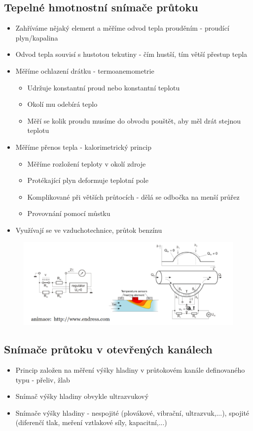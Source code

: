 \subsection*{Tepelné hmotnostní snímače průtoku}
\begin{itemize}
    \item Zahříváme nějaký element a měříme odvod tepla prouděním - proudící plyn/kapalina
    \item Odvod tepla souvisí s hustotou tekutiny - čím hustší, tím větší přestup tepla
    \item Měříme ochlazení drátku - termoanemometrie \begin{itemize}
        \item Udržuje konstantní proud nebo konstantní teplotu
        \item Okolí mu odebírá teplo
        \item Měří se kolik proudu musíme do obvodu pouštět, aby měl drát stejnou teplotu
    \end{itemize}
    \item Měříme přenos tepla - kalorimetrický princip \begin{itemize}
        \item Měříme rozložení teploty v okolí zdroje
        \item Protékající plyn deformuje teplotní pole
        \item Komplikované při větších průtocích - dělá se odbočka na menší průřez
        \item Provovnání pomocí můstku
    \end{itemize}
    \item Využívají se ve vzduchotechnice, průtok benzínu
\end{itemize}

\begin{figure}[h]
    \centering
    \includegraphics[scale = 1]{img/kalorime.png}
\end{figure}

\subsection*{Snímače průtoku v otevřených kanálech}
\begin{itemize}
    \item Princip založen na měření výšky hladiny v průtokovém kanále definovaného typu - přeliv, žlab
    \item Snímač výšky hladiny obvykle ultrazvukový
    \item Snímače výšky hladiny - nespojité (plovákové, vibrační, ultrazvuk,...), spojité (diferenčí tlak, meření vztlakové síly, kapacitní,...)
\end{itemize}

